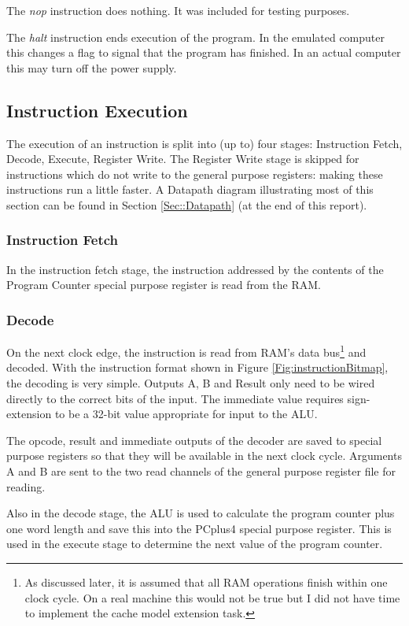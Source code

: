\documentclass[11pt,a4paper]{IEEEtran}
\begin{document}
				The \textit{nop} instruction does nothing. It was included for testing purposes. 
				
				The \textit{halt} instruction ends execution of the program. In the emulated computer this changes a flag to signal that the program has finished. In an actual computer this may turn off the power supply.
		
		\subsection{Instruction Execution}
			The execution of an instruction is split into (up to) four stages: Instruction Fetch, Decode, Execute, Register Write. The Register Write stage is skipped for instructions which do not write to the general purpose registers: making these instructions run a little faster. A Datapath diagram illustrating most of this section can be found in Section \ref{Sec::Datapath} (at the end of this report).
			
			\subsubsection{Instruction Fetch}
				In the instruction fetch stage, the instruction addressed by the contents of the Program Counter special purpose register is read from the RAM.
				
			\subsubsection{Decode}
				On the next clock edge, the instruction is read from RAM's data bus\footnote{As discussed later, it is assumed that all RAM operations finish within one clock cycle. On a real machine this would not be true but I did not have time to implement the cache model extension task.} and decoded. With the instruction format shown in Figure \ref{Fig:instructionBitmap}, the decoding is very simple. Outputs A, B and Result only need to be wired directly to the correct bits of the input. The immediate value requires sign-extension to be a 32-bit value appropriate for input to the ALU. 
				
				The opcode, result and immediate outputs of the decoder are saved to special purpose registers so that they will be available in the next clock cycle. Arguments A and B are sent to the two read channels of the general purpose register file for reading. 
				
				Also in the decode stage, the ALU is used to calculate the program counter plus one word length and save this into the PCplus4 special purpose register. This is used in the execute stage to determine the next value of the program counter. 
			
\end{document}
